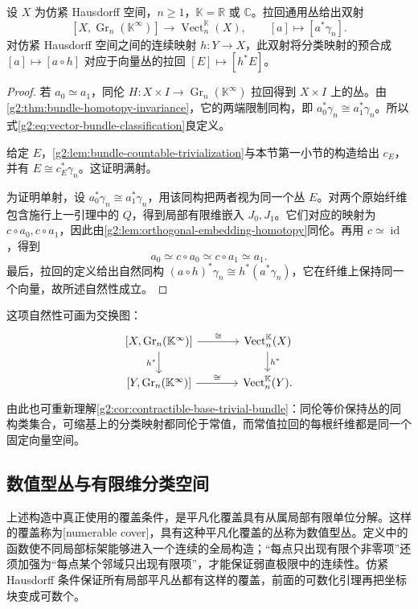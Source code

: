 \begin{theorem}\label{g2:thm:vector-bundle-classification}
	设 \(X\) 为仿紧 Hausdorff 空间，\(n\ge1\)，\(\mathbb K=\mathbb R\) 或 \(\mathbb C\)。拉回通用丛给出双射
	\begin{equation}\label{g2:eq:vector-bundle-classification}
		[X,\operatorname{Gr}_n(\mathbb K^\infty)]
		\longrightarrow\operatorname{Vect}^{\mathbb K}_n(X),
		\qquad [a]\longmapsto[a^*\gamma_n].
	\end{equation}
	对仿紧 Hausdorff 空间之间的连续映射 \(h:Y\to X\)，此双射将分类映射的预合成 \([a]\mapsto[a\circ h]\) 对应于向量丛的拉回 \([E]\mapsto[h^*E]\)。
\end{theorem}
\begin{proof}
	若 \(a_0\simeq a_1\)，同伦 \(H:X\times I\to\operatorname{Gr}_n(\mathbb K^\infty)\) 拉回得到 \(X\times I\) 上的丛。由\cref{g2:thm:bundle-homotopy-invariance}，它的两端限制同构，即 \(a_0^*\gamma_n\cong a_1^*\gamma_n\)。所以式\eqref{g2:eq:vector-bundle-classification}良定义。

	给定 \(E\)，\cref{g2:lem:bundle-countable-trivialization}与本节第一小节的构造给出 \(c_E\)，并有 \(E\cong c_E^*\gamma_n\)。这证明满射。

	为证明单射，设 \(a_0^*\gamma_n\cong a_1^*\gamma_n\)，用该同构把两者视为同一个丛 \(E\)。对两个原始纤维包含施行上一引理中的 \(Q\)，得到局部有限维嵌入 \(J_0,J_1\)。它们对应的映射为 \(c\circ a_0,c\circ a_1\)，因此由\cref{g2:lem:orthogonal-embedding-homotopy}同伦。再用 \(c\simeq\operatorname{id}\)，得到
	\[
		a_0\simeq c\circ a_0\simeq c\circ a_1\simeq a_1.
	\]
	最后，拉回的定义给出自然同构 \((a\circ h)^*\gamma_n\cong h^*(a^*\gamma_n)\)，它在纤维上保持同一个向量，故所述自然性成立。
\end{proof}

这项自然性可画为交换图：
\[
	\begin{tikzcd}[column sep=large]
		{[X,\operatorname{Gr}_n(\mathbb K^\infty)]} \arrow[r,"\cong"] \arrow[d,"h^*"']
		&\operatorname{Vect}^{\mathbb K}_n(X) \arrow[d,"h^*"]\\
		{[Y,\operatorname{Gr}_n(\mathbb K^\infty)]} \arrow[r,"\cong"]
		&\operatorname{Vect}^{\mathbb K}_n(Y).
	\end{tikzcd}
\]
由此也可重新理解\cref{g2:cor:contractible-base-trivial-bundle}：同伦等价保持丛的同构类集合，可缩基上的分类映射都同伦于常值，而常值拉回的每根纤维都是同一个固定向量空间。

\subsection{数值型丛与有限维分类空间}
\label{g2:subsec:1903:04}
上述构造中真正使用的覆盖条件，是平凡化覆盖具有从属局部有限单位分解。这样的覆盖称为[numerable cover]，具有这种平凡化覆盖的丛称为数值型丛。定义中的函数使不同局部标架能够进入一个连续的全局构造；“每点只出现有限个非零项”还须加强为“每点某个邻域只出现有限项”，才能保证弱直极限中的连续性。仿紧 Hausdorff 条件保证所有局部平凡丛都有这样的覆盖，前面的可数化引理再把坐标块变成可数个。

